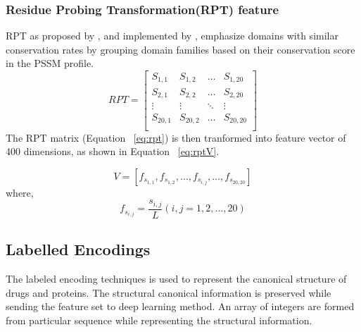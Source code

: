   \subsubsection{Residue Probing Transformation(RPT) feature}
  RPT as proposed by \citep{Jeong2011}, and implemented by \citep{Mishra2019}, emphasize domains with similar conservation rates by grouping domain families based on their conservation score in the PSSM profile.
  \begin{equation}
    RPT = \begin{bmatrix}
      S_{1,1} & S_{1,2} & \dots & S_{1,20} \\
      S_{2,1} & S_{2,2} & \dots & S_{2,20} \\
      \vdots  & \vdots  & \ddots & \vdots \\
      S_{20,1} & S_{20,2} & \dots & S_{20,20} \\
    \end{bmatrix}
    \label{eq:rpt}
  \end{equation}
  The RPT matrix (Equation ~\ref{eq:rpt}) is then tranformed into feature vector of 400 dimensions, as shown in Equation ~\ref{eq:rptV}.
  
  \begin{equation}
    V = [ f_{s_{1,1}}, f_{s_{1,2}}, \dots, f_{s_{i,j}}, \dots, f_{s_{20,20}} ]
    \label{eq:rptV}
  \end{equation}
  where, 
  \begin{equation}
    f_{s_{i,j}} = \frac{s_{i,j}}{L} (i,j = 1,2,\dots,20)
    \label{eq:rptF}
  \end{equation}

  \subsection{Labelled Encodings}
  
  The labeled encoding techniques is used to represent the canonical structure of drugs and proteins. The structural canonical information is preserved while sending the feature set to deep learning method. An array of integers are formed from particular sequence while representing the structural information.
  
